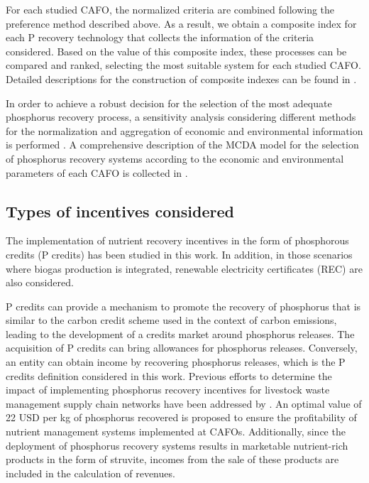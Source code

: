 \begin{refsection}[referencesCh5]
For each studied CAFO, the normalized criteria are combined following the preference method described above. As a result, we obtain a composite index for each P recovery technology that collects the information of the criteria considered. 
Based on the value of this composite index, these processes can be compared and ranked, selecting the most suitable system for each studied CAFO. Detailed descriptions for the construction of composite indexes can be found in  \citet{HandbookCompositeIndicators}. 

In order to achieve a robust decision for the selection of the most adequate phosphorus recovery process, a sensitivity analysis considering different methods for the normalization and aggregation of economic and environmental information is performed \citep{MarcoCinelli2020}. A comprehensive description of the MCDA model for the selection of phosphorus recovery systems according to the economic and environmental parameters of each CAFO is collected in \citet{Tool}.

\subsection{Types of incentives considered}
The implementation of nutrient recovery incentives in the form of phosphorous credits (P credits) has been studied in this work. In addition, in those scenarios where biogas production is integrated, renewable electricity certificates (REC) are also considered.

P credits can provide a mechanism to promote the recovery of phosphorus that is similar to the carbon credit scheme used in the context of carbon emissions, leading to the development of a credits market around phosphorus releases. The acquisition of P credits can bring allowances for phosphorus releases. Conversely, an entity can obtain income by recovering phosphorus releases, which is the P credits definition considered in this work. Previous efforts to determine the impact of implementing phosphorus recovery incentives for livestock waste management supply chain networks have been addressed by \citet{sampat_economic_2018}. An optimal value of 22 USD per kg of phosphorus recovered is proposed to ensure the profitability of nutrient management systems implemented at CAFOs. Additionally, since the deployment of phosphorus recovery systems results in marketable nutrient-rich products in the form of struvite, incomes from the sale of these products are included in the calculation of revenues.


\end{refsection}
